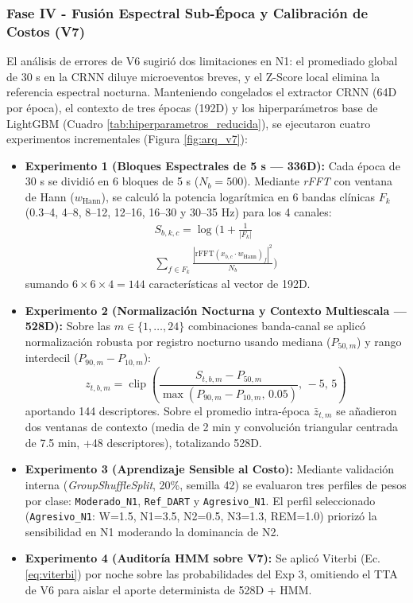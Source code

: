 \documentclass[conference]{IEEEtran}
\begin{document}
\subsubsection{Fase IV - Fusión Espectral Sub-Época y Calibración de Costos (V7)}
El análisis de errores de V6 sugirió dos limitaciones en N1: el promediado global de 30 s en la CRNN diluye microeventos breves, y el Z-Score local elimina la referencia espectral nocturna. Manteniendo congelados el extractor CRNN (64D por época), el contexto de tres épocas (192D) y los hiperparámetros base de LightGBM (Cuadro \ref{tab:hiperparametros_reducida}), se ejecutaron cuatro experimentos incrementales (Figura \ref{fig:arq_v7}):
\begin{itemize}
    \item \textbf{Experimento 1 (Bloques Espectrales de 5 s --- 336D):} Cada época de 30 s se dividió en 6 bloques de 5 s ($N_b = 500$). Mediante \textit{rFFT} con ventana de Hann ($w_{\text{Hann}}$), se calculó la potencia logarítmica en 6 bandas clínicas $F_k$ (0.3--4, 4--8, 8--12, 12--16, 16--30 y 30--35 Hz) para los 4 canales:
    \begin{multline}
    S_{b,k,c} = \log\!\Bigg(1 + \frac{1}{|F_k|} \\
    \sum_{f \in F_k} \frac{\left|\text{rFFT}(x_{b,c} \cdot w_{\text{Hann}})_f\right|^2}{N_b}\Bigg)
    \label{eq:rfft_power}
    \end{multline}
    sumando $6 \times 6 \times 4 = 144$ características al vector de 192D.
    \item \textbf{Experimento 2 (Normalización Nocturna y Contexto Multiescala --- 528D):} Sobre las $m \in \{1,\dots,24\}$ combinaciones banda-canal se aplicó normalización robusta por registro nocturno usando mediana ($P_{50,m}$) y rango interdecil ($P_{90,m} - P_{10,m}$):
    \begin{equation}
    z_{t,b,m} = \operatorname{clip}\!\left(\frac{S_{t,b,m} - P_{50,m}}{\max(P_{90,m} - P_{10,m},\, 0.05)},\, -5,\, 5\right)
    \label{eq:robust_norm}
    \end{equation}
    aportando 144 descriptores. Sobre el promedio intra-época $\bar{z}_{t,m}$ se añadieron dos ventanas de contexto (media de 2 min y convolución triangular centrada de 7.5 min, +48 descriptores), totalizando 528D.
    \item \textbf{Experimento 3 (Aprendizaje Sensible al Costo):} Mediante validación interna (\textit{GroupShuffleSplit}, 20\%, semilla 42) se evaluaron tres perfiles de pesos por clase: \texttt{Moderado\_N1}, \texttt{Ref\_DART} y \texttt{Agresivo\_N1}. El perfil seleccionado (\texttt{Agresivo\_N1}: W=1.5, N1=3.5, N2=0.5, N3=1.3, REM=1.0) priorizó la sensibilidad en N1 moderando la dominancia de N2.
    \item \textbf{Experimento 4 (Auditoría HMM sobre V7):} Se aplicó Viterbi (Ec. \eqref{eq:viterbi}) por noche sobre las probabilidades del Exp 3, omitiendo el TTA de V6 para aislar el aporte determinista de 528D + HMM.
\end{itemize}
\end{document}
